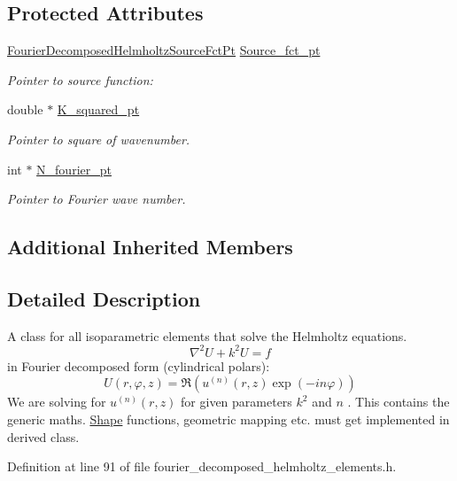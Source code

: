 \subsection*{Protected Attributes}
\begin{DoxyCompactItemize}
\item 
\hyperlink{classoomph_1_1FourierDecomposedHelmholtzEquations_a66a39c7967ffeedd994c206e2a5f0d4e}{Fourier\+Decomposed\+Helmholtz\+Source\+Fct\+Pt} \hyperlink{classoomph_1_1FourierDecomposedHelmholtzEquations_a05ffb07e54845415be8185222e337a0f}{Source\+\_\+fct\+\_\+pt}
\begin{DoxyCompactList}\small\item\em Pointer to source function\+: \end{DoxyCompactList}\item 
double $\ast$ \hyperlink{classoomph_1_1FourierDecomposedHelmholtzEquations_a522ed0be0b5316b7a2dbae9e6a013403}{K\+\_\+squared\+\_\+pt}
\begin{DoxyCompactList}\small\item\em Pointer to square of wavenumber. \end{DoxyCompactList}\item 
int $\ast$ \hyperlink{classoomph_1_1FourierDecomposedHelmholtzEquations_a3155682758b790c46ca6d2e9eea2fb92}{N\+\_\+fourier\+\_\+pt}
\begin{DoxyCompactList}\small\item\em Pointer to Fourier wave number. \end{DoxyCompactList}\end{DoxyCompactItemize}
\subsection*{Additional Inherited Members}


\subsection{Detailed Description}
A class for all isoparametric elements that solve the Helmholtz equations. \[ \nabla^2 U + k^2 U = f \] in Fourier decomposed form (cylindrical polars)\+: \[ U(r,\varphi,z) = \Re( u^{(n)}(r,z) \exp(-i n \varphi)) \] We are solving for $ u^{(n)}(r,z)$ for given parameters $ k^2 $ and $ n $ . This contains the generic maths. \hyperlink{classoomph_1_1Shape}{Shape} functions, geometric mapping etc. must get implemented in derived class. 

Definition at line 91 of file fourier\+\_\+decomposed\+\_\+helmholtz\+\_\+elements.\+h.




